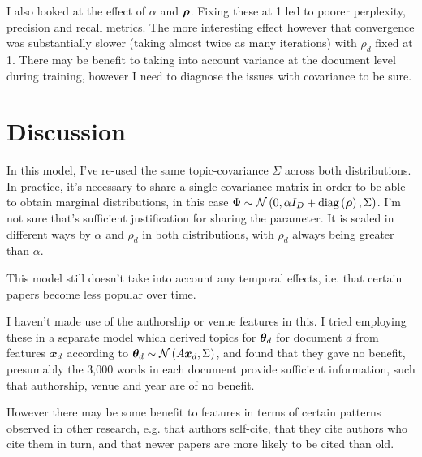 I also looked at the effect of $\alpha$ and $\bm \rho$. Fixing these at 1 led to poorer perplexity, precision and recall metrics. The more interesting effect however that convergence was substantially slower (taking almost twice as many iterations) with $\rho_d$ fixed at 1. There may be benefit to taking into account variance at the document level during training, however I need to diagnose the issues with covariance to be sure. %

\section{Discussion}
In this model, I've re-used the same topic-covariance $\Sigma$ across both distributions. In practice, it's necessary to share a single covariance matrix in order to be able to obtain marginal distributions, in this case $\Phi \sim \mathcal{N} \left(0, \alpha I_D + \text{diag} \left( {\bm \rho} \right), \Sigma\right)$. I'm not sure that's sufficient justification for sharing the parameter. It is scaled in different ways by $\alpha$ and $\rho_d$ in both distributions, with $\rho_d$ always being greater than $\alpha$.

This model still doesn't take into account any temporal effects, i.e. that certain papers become less popular over time. 

I haven't made use of the authorship or venue features in this. I tried employing these in a separate model which derived topics for ${ \bm \theta_d }$ for document $d$ from features ${ \bm x_d }$ according to ${ \bm \theta_d } \sim \mathcal{N} \left( {A { \bm x_d }}, {\Sigma} \right)$, and found that they gave no benefit, presumably the 3,000 words in each document provide sufficient information, such that authorship, venue and year are of no benefit. 

However there may be some benefit to features in terms of certain patterns observed in other research\cite{Bethard2010}, e.g. that authors self-cite, that they cite authors who cite them in turn, and that newer papers are more likely to be cited than old. 